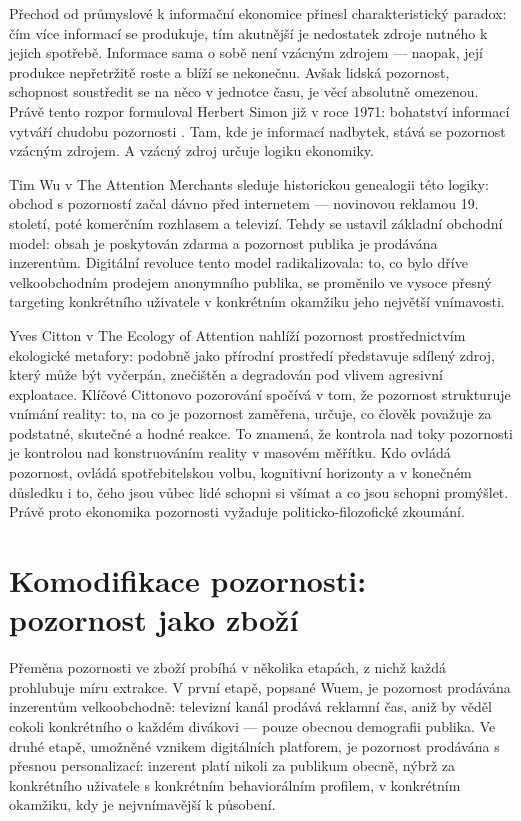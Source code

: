 Přechod od průmyslové k informační ekonomice přinesl charakteristický paradox: čím více informací se produkuje, tím akutnější je nedostatek zdroje nutného k jejich spotřebě.
Informace sama o sobě není vzácným zdrojem — naopak, její produkce nepřetržitě roste a blíží se nekonečnu.
Avšak lidská pozornost, schopnost soustředit se na něco v jednotce času, je věcí absolutně omezenou.
Právě tento rozpor formuloval Herbert Simon již v roce 1971: bohatství informací vytváří chudobu pozornosti \parencite{Simon71}.
Tam, kde je informací nadbytek, stává se pozornost vzácným zdrojem. A vzácný zdroj určuje logiku ekonomiky.

Tim Wu v The Attention Merchants \parencite{Wu16} sleduje historickou genealogii této logiky: obchod s pozorností začal dávno před internetem — novinovou reklamou 19. století, poté komerčním rozhlasem a televizí. Tehdy se ustavil základní obchodní model: obsah je poskytován zdarma a pozornost publika je prodávána inzerentům. Digitální revoluce tento model radikalizovala: to, co bylo dříve velkoobchodním prodejem anonymního publika, se proměnilo ve vysoce přesný targeting konkrétního uživatele v konkrétním okamžiku jeho největší vnímavosti.

Yves Citton v The Ecology of Attention \parencite{Citton17} nahlíží pozornost prostřednictvím ekologické metafory: podobně jako přírodní prostředí představuje sdílený zdroj, který může být vyčerpán, znečištěn a degradován pod vlivem agresivní exploatace. Klíčové Cittonovo pozorování spočívá v tom, že pozornost strukturuje vnímání reality: to, na co je pozornost zaměřena, určuje, co člověk považuje za podstatné, skutečné a hodné reakce. To znamená, že kontrola nad toky pozornosti je kontrolou nad konstruováním reality v masovém měřítku. Kdo ovládá pozornost, ovládá spotřebitelskou volbu, kognitivní horizonty a v konečném důsledku i to, čeho jsou vůbec lidé schopni si všímat a co jsou schopni promýšlet. Právě proto ekonomika pozornosti vyžaduje politicko-filozofické zkoumání.

\section{Komodifikace pozornosti: pozornost jako zboží}

Přeměna pozornosti ve zboží probíhá v několika etapách, z nichž každá prohlubuje míru extrakce.
V první etapě, popsané Wuem, je pozornost prodávána inzerentům velkoobchodně: televizní kanál prodává reklamní čas, aniž by věděl cokoli konkrétního o každém divákovi — pouze obecnou demografii publika. Ve druhé etapě, umožněné vznikem digitálních platforem, je pozornost prodávána s přesnou personalizací: inzerent platí nikoli za publikum obecně, nýbrž za konkrétního uživatele s konkrétním behaviorálním profilem, v konkrétním okamžiku, kdy je nejvnímavější k působení.

